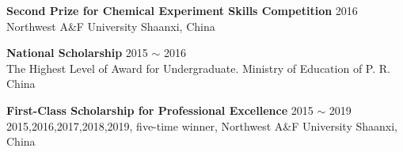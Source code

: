     






\vspace{4pt}

\textbf{Second Prize for Chemical Experiment Skills Competition} \hfill 2016 \\
{\small Northwest A\&F University \hfill Shaanxi, China}



\vspace{4pt}

\textbf{National Scholarship} \hfill 2015 $\sim$ 2016 \\
{\small The Highest Level of Award for Undergraduate. \hfill Ministry of Education of P. R. China}\\


\vspace{4pt}

\textbf{First-Class Scholarship for Professional Excellence} \hfill 2015 $\sim$ 2019 \\
{\small 2015,2016,2017,2018,2019, five-time winner, Northwest A\&F University \hfill Shaanxi, China}


